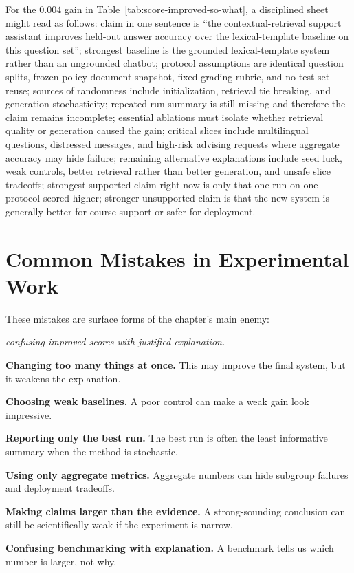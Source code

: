 \begin{example}
For the $0.004$ gain in Table~\ref{tab:score-improved-so-what}, a disciplined sheet might read as follows: claim in one sentence is ``the contextual-retrieval support assistant improves held-out answer accuracy over the lexical-template baseline on this question set''; strongest baseline is the grounded lexical-template system rather than an ungrounded chatbot; protocol assumptions are identical question splits, frozen policy-document snapshot, fixed grading rubric, and no test-set reuse; sources of randomness include initialization, retrieval tie breaking, and generation stochasticity; repeated-run summary is still missing and therefore the claim remains incomplete; essential ablations must isolate whether retrieval quality or generation caused the gain; critical slices include multilingual questions, distressed messages, and high-risk advising requests where aggregate accuracy may hide failure; remaining alternative explanations include seed luck, weak controls, better retrieval rather than better generation, and unsafe slice tradeoffs; strongest supported claim right now is only that one run on one protocol scored higher; stronger unsupported claim is that the new system is generally better for course support or safer for deployment.
\end{example}

\section{Common Mistakes in Experimental Work}

These mistakes are surface forms of the chapter's main enemy:

\begin{center}
\emph{confusing improved scores with justified explanation.}
\end{center}

\begin{mistakebox}
\item \textbf{Changing too many things at once.} This may improve the final system, but it weakens the explanation.
\item \textbf{Choosing weak baselines.} A poor control can make a weak gain look impressive.
\item \textbf{Reporting only the best run.} The best run is often the least informative summary when the method is stochastic.
\item \textbf{Using only aggregate metrics.} Aggregate numbers can hide subgroup failures and deployment tradeoffs.
\item \textbf{Making claims larger than the evidence.} A strong-sounding conclusion can still be scientifically weak if the experiment is narrow.
\item \textbf{Confusing benchmarking with explanation.} A benchmark tells us which number is larger, not why.
\end{mistakebox}

